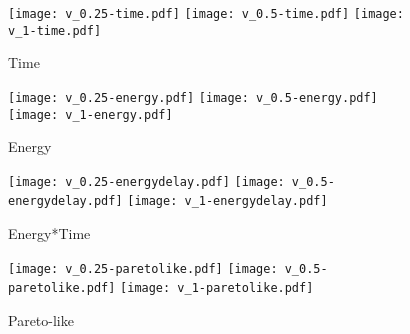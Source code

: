 \documentclass{article}
\begin{document}


\begin{landscape}
\begin{figure}
\centering
\texttt{[image: v\_0.25-time.pdf]}
\texttt{[image: v\_0.5-time.pdf]}
\texttt{[image: v\_1-time.pdf]} 
\vspace{-.5cm}
\caption{Time}

\texttt{[image: v\_0.25-energy.pdf]}
\texttt{[image: v\_0.5-energy.pdf]}
\texttt{[image: v\_1-energy.pdf]} 
\vspace{-.5cm}
\caption{Energy}

\texttt{[image: v\_0.25-energydelay.pdf]}
\texttt{[image: v\_0.5-energydelay.pdf]}
\texttt{[image: v\_1-energydelay.pdf]} 
\vspace{-.5cm}
\caption{Energy*Time}

\texttt{[image: v\_0.25-paretolike.pdf]}
\texttt{[image: v\_0.5-paretolike.pdf]}
\texttt{[image: v\_1-paretolike.pdf]} 
\vspace{-.5cm}
\caption{Pareto-like}


\end{figure}
\end{landscape}
\end{document}
